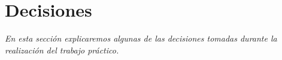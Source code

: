 \section{Decisiones}

\textsl{En esta secci\'on explicaremos algunas de las decisiones
tomadas durante la realizaci\'on del trabajo pr\'actico.}

\vspace*{0.5cm}


